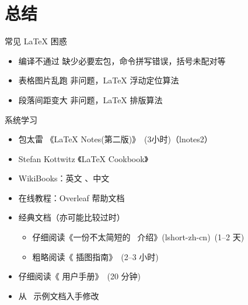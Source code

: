 
\section{总结}

\printcurrenttoc

\begin{frame}{常见 \LaTeX{} 困惑}
  \begin{itemize}
    \item \alert{编译不通过} 缺少必要宏包，命令拼写错误，括号未配对等
    \item \alert{表格图片乱跑} 非问题，\LaTeX{} 浮动定位算法 
    \item \alert{段落间距变大} 非问题，\LaTeX{} 排版算法
  \end{itemize}
\end{frame}

\begin{frame}{系统学习}
  \begin{itemize}
      \item 包太雷 《\LaTeX{} Notes(第二版)》~(3小时)（lnotes2） 
      \item Stefan Kottwitz 《LaTeX Cookbook》
      \item WikiBooks：英文 、中文 
      \item 在线教程：Overleaf 帮助文档 
      \item 经典文档（亦可能比较过时）
        \begin{itemize}
          \item 仔细阅读《一份不太简短的~\LaTeXe{} 介绍》(lshort-zh-cn)~(1--2 天)
          \item 粗略阅读《\LaTeXe{} 插图指南》~(2--3 小时)
        \end{itemize}
      \item 仔细阅读《\ThuThesis{} 用户手册》~(20 分钟)
      \item 从~\ThuThesis{} 示例文档入手修改
  \end{itemize}
\end{frame}

